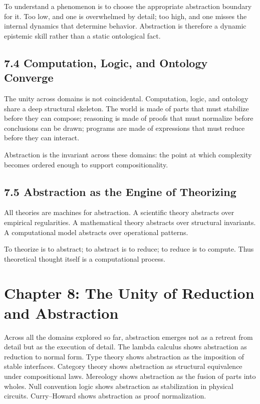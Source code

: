 \documentclass[11pt,letterpaper]{article}
\begin{document}
To understand a phenomenon is to choose the appropriate abstraction boundary for it. Too low, and one is overwhelmed by detail; too high, and one misses the internal dynamics that determine behavior. Abstraction is therefore a dynamic epistemic skill rather than a static ontological fact.

\subsection{7.4 Computation, Logic, and Ontology Converge}

The unity across domains is not coincidental. Computation, logic, and ontology share a deep structural skeleton. The world is made of parts that must stabilize before they can compose; reasoning is made of proofs that must normalize before conclusions can be drawn; programs are made of expressions that must reduce before they can interact.

Abstraction is the invariant across these domains: the point at which complexity becomes ordered enough to support compositionality.

\subsection{7.5 Abstraction as the Engine of Theorizing}

All theories are machines for abstraction. A scientific theory abstracts over empirical regularities. A mathematical theory abstracts over structural invariants. A computational model abstracts over operational patterns.

To theorize is to abstract; to abstract is to reduce; to reduce is to compute. Thus theoretical thought itself is a computational process.

\newpage

\section{Chapter 8: The Unity of Reduction and Abstraction}

Across all the domains explored so far, abstraction emerges not as a retreat from detail but as the execution of detail. The lambda calculus shows abstraction as reduction to normal form. Type theory shows abstraction as the imposition of stable interfaces. Category theory shows abstraction as structural equivalence under compositional laws. Mereology shows abstraction as the fusion of parts into wholes. Null convention logic shows abstraction as stabilization in physical circuits. Curry--Howard shows abstraction as proof normalization.
\end{document}
